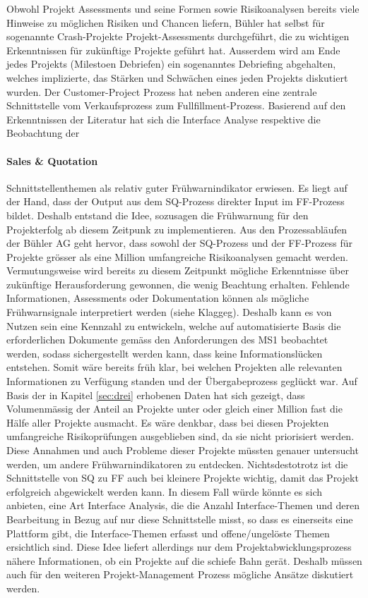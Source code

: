 \newline Obwohl Projekt Assessments und seine Formen sowie Risikoanalysen bereits viele Hinweise zu möglichen Risiken und Chancen liefern, 
Bühler hat selbst für sogenannte Crash-Projekte Projekt-Assessments durchgeführt, die zu wichtigen Erkenntnissen für zukünftige Projekte geführt hat. Ausserdem wird am Ende jedes Projekts (Milestoen Debriefen) ein sogenanntes Debriefing abgehalten, welches implizierte, das Stärken und Schwächen eines jeden Projekts diskutiert wurden. Der Customer-Project Prozess hat neben anderen eine zentrale Schnittstelle vom Verkaufsprozess zum Fullfillment-Prozess. Basierend auf den Erkenntnissen der Literatur hat sich die Interface Analyse respektive die Beobachtung der
\paragraph{Sales \& Quotation} Schnittstellenthemen als relativ guter Frühwarnindikator erwiesen. Es liegt auf der Hand, dass der Output aus dem SQ-Prozess direkter Input im FF-Prozess bildet. Deshalb entstand die Idee, sozusagen die Frühwarnung für den Projekterfolg ab diesem Zeitpunk zu implementieren. Aus den Prozessabläufen der Bühler AG geht hervor, dass sowohl der SQ-Prozess und der FF-Prozess für Projekte grösser als eine Million umfangreiche Risikoanalysen gemacht werden. Vermutungsweise wird bereits zu diesem Zeitpunkt mögliche Erkenntnisse über zukünftige Herausforderung gewonnen, die wenig Beachtung erhalten. Fehlende Informationen, Assessments oder Dokumentation können als mögliche Frühwarnsignale interpretiert werden (siehe Klaggeg). Deshalb kann es von Nutzen sein eine Kennzahl zu entwickeln, welche auf automatisierte Basis die erforderlichen Dokumente gemäss den Anforderungen des MS1 beobachtet werden, sodass sichergestellt werden kann, dass keine Informationslücken entstehen. Somit wäre bereits früh klar, bei welchen Projekten alle relevanten Informationen zu Verfügung standen und der Übergabeprozess geglückt war. Auf Basis der in Kapitel \ref{sec:drei} erhobenen Daten hat sich gezeigt, dass Volumenmässig der Anteil an Projekte unter oder gleich einer Million fast die Hälfe aller Projekte ausmacht. Es wäre denkbar, dass bei diesen Projekten umfangreiche Risikoprüfungen ausgeblieben sind, da sie nicht priorisiert werden. Diese Annahmen und auch Probleme dieser Projekte müssten genauer untersucht werden, um andere Frühwarnindikatoren zu entdecken. Nichtsdestotrotz ist die Schnittstelle von SQ zu FF auch bei kleinere Projekte wichtig, damit das Projekt erfolgreich abgewickelt werden kann. In diesem Fall würde könnte es sich anbieten, eine Art Interface Analysis, die die Anzahl Interface-Themen und deren Bearbeitung in Bezug auf nur diese Schnittstelle misst, so dass es einerseits eine Plattform gibt, die Interface-Themen erfasst und offene/ungelöste Themen ersichtlich sind. Diese Idee liefert allerdings nur dem Projektabwicklungsprozess nähere Informationen, ob ein Projekte auf die schiefe Bahn gerät. Deshalb müssen auch für den weiteren Projekt-Management Prozess mögliche Ansätze diskutiert werden.
